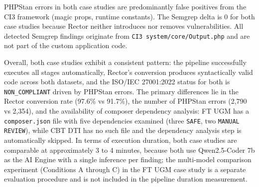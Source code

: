 \noindent PHPStan errors in both case studies are predominantly false positives from the CI3 framework (magic props, runtime constants). The Semgrep delta is 0 for both case studies because Rector neither introduces nor removes vulnerabilities. All detected Semgrep findings originate from \texttt{CI3 system/core/Output.php} and are not part of the custom application code.

Overall, both case studies exhibit a consistent pattern: the pipeline successfully executes all stages automatically, Rector's conversion produces syntactically valid code across both datasets, and the ISO/IEC 27001:2022 status for both is \texttt{NON\_COMPLIANT} driven by PHPStan errors. The primary differences lie in the Rector conversion rate (97.6\% vs 91.7\%), the number of PHPStan errors (2,790 vs 2,354), and the availability of composer dependency analysis: FT UGM has a \texttt{composer.json} file with five dependencies examined (three \texttt{SAFE}, two \texttt{MANUAL REVIEW}), while CBT DTI has no such file and the dependency analysis step is automatically skipped. In terms of execution duration, both case studies are comparable at approximately 3 to 4 minutes, because both use Qwen2.5-Coder 7b as the AI Engine with a single inference per finding; the multi-model comparison experiment (Conditions A through C) in the FT UGM case study is a separate evaluation procedure and is not included in the pipeline duration measurement.